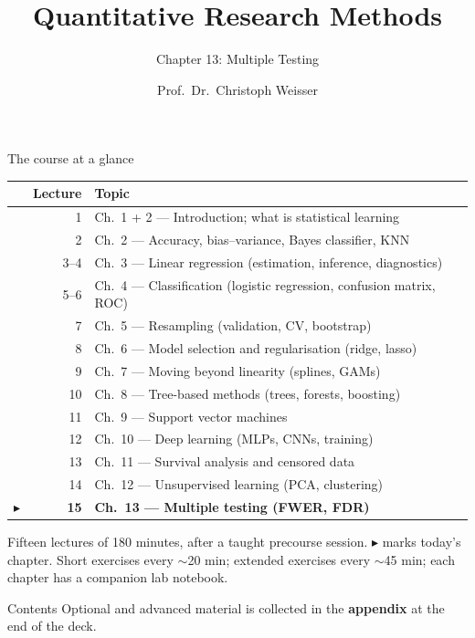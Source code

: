 \documentclass[aspectratio=169,11pt]{beamer}
\title{Quantitative Research Methods}
\subtitle{Chapter 13: Multiple Testing}
\author{Prof.\ Dr.\ Christoph Weisser}\institute{HSBI}
\date{}\graphicspath{{images/}}
\begin{document}
\begin{frame}[plain]\titlepage\end{frame}

\begin{frame}{The course at a glance}
  \scriptsize
  \begin{center}
  \begin{tabular}{@{}c r l@{}}
    & \textbf{Lecture} & \textbf{Topic}\\
    \midrule
    & 1 & Ch.\ 1 + 2 --- Introduction; what is statistical learning \\
    & 2 & Ch.\ 2 --- Accuracy, bias--variance, Bayes classifier, KNN \\
    & 3--4 & Ch.\ 3 --- Linear regression (estimation, inference, diagnostics) \\
    & 5--6 & Ch.\ 4 --- Classification (logistic regression, confusion matrix, ROC) \\
    & 7 & Ch.\ 5 --- Resampling (validation, CV, bootstrap) \\
    & 8 & Ch.\ 6 --- Model selection and regularisation (ridge, lasso) \\
    & 9 & Ch.\ 7 --- Moving beyond linearity (splines, GAMs) \\
    & 10 & Ch.\ 8 --- Tree-based methods (trees, forests, boosting) \\
    & 11 & Ch.\ 9 --- Support vector machines \\
    & 12 & Ch.\ 10 --- Deep learning (MLPs, CNNs, training) \\
    & 13 & Ch.\ 11 --- Survival analysis and censored data \\
    & 14 & Ch.\ 12 --- Unsupervised learning (PCA, clustering) \\
    $\blacktriangleright$ & \textbf{15} & \textbf{Ch.\ 13 --- Multiple testing (FWER, FDR)} \\
  \end{tabular}
  \end{center}
  \vspace{2pt}
  {\scriptsize Fifteen lectures of 180 minutes, after a taught precourse session. $\blacktriangleright$ marks today's chapter. Short exercises every $\sim$20 min; extended exercises every $\sim$45 min; each chapter has a companion lab notebook.}
\end{frame}


\begin{frame}{Contents}\small\tableofcontents[hideallsubsections]
  \vfill
  {\tiny Optional and advanced material is collected in the \textbf{appendix} at the end of the deck.}
\end{frame}
\end{document}
